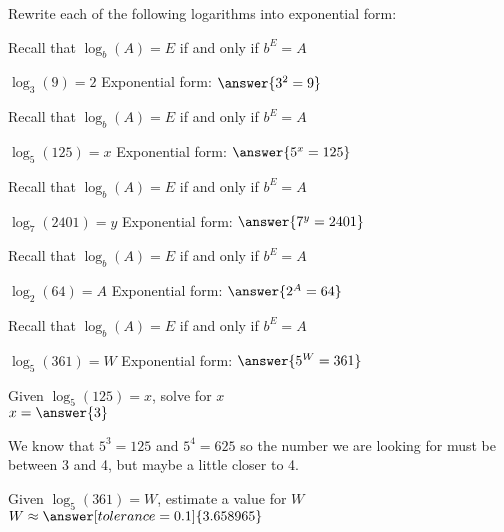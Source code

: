 \documentclass{ximera}
\author{Lee Wayand}
\begin{document}
\begin{example}


\begin{question}

Rewrite each of the following logarithms into exponential form:
\begin{hint}
	Recall that $\log_b(A)=E$ if and only if $b^E=A$
\end{hint}
$\log_3(9)=2$  \qquad Exponential form:  $\answer{3^2=9}$  \\
\begin{hint}
	Recall that $\log_b(A)=E$ if and only if $b^E=A$
\end{hint}
$\log_5(125)=x$  \qquad Exponential form:  $\answer{5^x=125}$  \\
\begin{hint}
	Recall that $\log_b(A)=E$ if and only if $b^E=A$
\end{hint}
$\log_7(2401)=y$  \qquad Exponential form:  $\answer{7^y=2401}$  \\
\begin{hint}
	Recall that $\log_b(A)=E$ if and only if $b^E=A$
\end{hint}
$\log_2(64)=A$  \qquad Exponential form:  $\answer{2^A=64} $ \\
\begin{hint}
	Recall that $\log_b(A)=E$ if and only if $b^E=A$
\end{hint}
$\log_5(361)=W$  \qquad Exponential form: $ \answer{5^W=361} $ \\


\end{question}




\begin{question}

Given $\log_5(125)=x$, solve for $x$ \\

$x=\answer{3}$

\end{question}


\begin{question}
	
\begin{hint}
	We know that $5^3=125$ and $5^4=625$ so the number we are looking for must be between 3 and 4, but maybe a little closer to 4.
\end{hint}
Given $\log_5(361)=W$, estimate a value for $W$ \\

$W \approx \answer[tolerance=0.1]{3.658965}$


\end{question}
\end{example}
\end{document}
